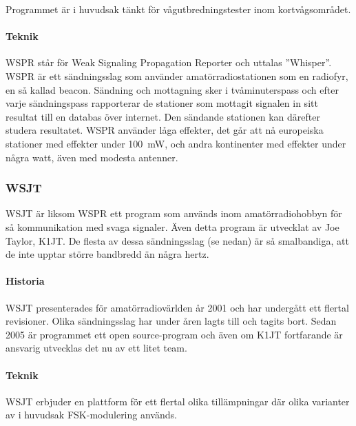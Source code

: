 Programmet är i huvudsak tänkt för vågutbredningstester inom kortvågsområdet.

\paragraph{Teknik}

WSPR står för Weak Signaling Propagation Reporter och uttalas ''Whisper''.
WSPR är ett sändningsslag som använder amatörradiostationen som en radiofyr, en
så kallad beacon. Sändning och mottagning sker i tvåminuterspass och efter varje
sändningspass rapporterar de stationer som mottagit signalen in sitt resultat till en
databas över internet.
Den sändande stationen kan därefter studera resultatet.
WSPR använder låga effekter, det går att nå europeiska stationer med effekter
under \SI{100}{\milli\watt}, och andra kontinenter med effekter under några
watt, även med modesta antenner.

\subsubsection{WSJT}

WSJT är liksom WSPR ett program som används inom amatörradiohobbyn för så
kommunikation med svaga signaler.
Även detta program är utvecklat av Joe Taylor, K1JT.
De flesta av dessa sändningsslag (se nedan) är så smalbandiga, att de inte upptar
större bandbredd än några hertz.

\paragraph{Historia}

WSJT presenterades för amatörradiovärlden år 2001 och har undergått ett flertal
revisioner.
Olika sändningsslag har under åren lagts till och tagits bort.
Sedan 2005 är programmet ett open source-program och även om K1JT fortfarande
är ansvarig utvecklas det nu av ett litet team.

\paragraph{Teknik}

WSJT erbjuder en plattform för ett flertal olika tillämpningar där olika
varianter av i huvudsak FSK-modulering används.

